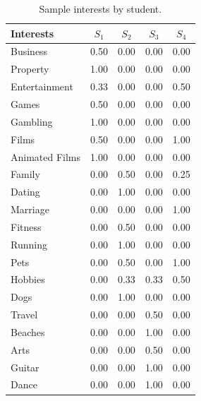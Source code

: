 \begin{table}[]
\centering
\begin{tabular}{lcccc}
\hline
Interests & $S_1$      & $S_2$      & $S_3$      & $S_4$      \\ \hline
Business       & 0.50 & 0.00 & 0.00 & 0.00       \\
Property       & 1.00 & 0.00 & 0.00 & 0.00       \\
Entertainment  & 0.33 & 0.00 & 0.00 & 0.50       \\
Games          & 0.50 & 0.00 & 0.00 & 0.00       \\
Gambling       & 1.00 & 0.00 & 0.00 & 0.00       \\
Films          & 0.50 & 0.00 & 0.00 & 1.00       \\
Animated Films & 1.00 & 0.00 & 0.00 & 0.00       \\
Family         & 0.00 & 0.50 & 0.00 & 0.25       \\
Dating         & 0.00 & 1.00 & 0.00 & 0.00       \\
Marriage       & 0.00 & 0.00 & 0.00 & 1.00       \\
Fitness        & 0.00 & 0.50 & 0.00 & 0.00       \\
Running        & 0.00 & 1.00 & 0.00 & 0.00       \\
Pets           & 0.00 & 0.50 & 0.00 & 1.00       \\
Hobbies        & 0.00 & 0.33 & 0.33 & 0.50       \\
Dogs           & 0.00 & 1.00 & 0.00 & 0.00       \\
Travel         & 0.00 & 0.00 & 0.50 & 0.00       \\
Beaches        & 0.00 & 0.00 & 1.00 & 0.00       \\
Arts           & 0.00 & 0.00 & 0.50 & 0.00       \\
Guitar         & 0.00 & 0.00 & 1.00 & 0.00       \\
Dance          & 0.00 & 0.00 & 1.00 & 0.00       \\ \hline
    \end{tabular}
    \caption{Sample interests by student.}
    \label{table:sample_interests}
\end{table}

